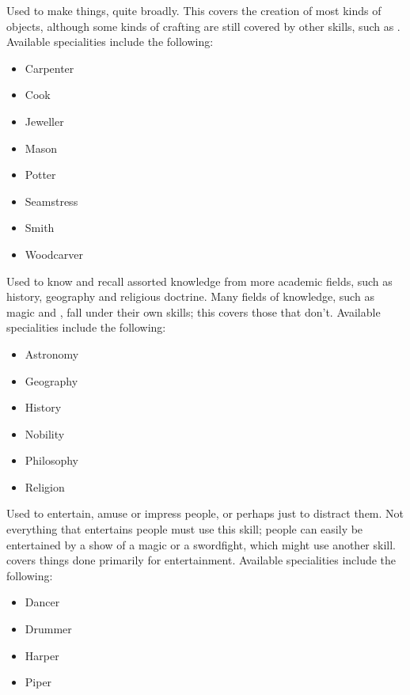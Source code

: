 
Used to make things, quite broadly.
This covers the creation of most kinds of objects, although some kinds of crafting are still covered by other skills, such as .
Available specialities include the following:

\begin{itemize}
	\item Carpenter
	\item Cook
	\item Jeweller
	\item Mason
	\item Potter
	\item Seamstress
	\item Smith
	\item Woodcarver
\end{itemize}


Used to know and recall assorted knowledge from more academic fields, such as history, geography and religious doctrine. %
Many fields of knowledge, such as magic and , fall under their own skills; this covers those that don't.
Available specialities include the following:

\begin{itemize}
	\item Astronomy
	\item Geography
	\item History
	\item Nobility
	\item Philosophy
	\item Religion %
\end{itemize}


Used to entertain, amuse or impress people, or perhaps just to distract them.
Not everything that entertains people must use this skill; people can easily be entertained by a show of a magic or a swordfight, which might use another skill.
 covers things done primarily for entertainment.
Available specialities include the following:

\begin{itemize}
	\item Dancer
	\item Drummer
	\item Harper
	\item Piper
\end{itemize}
